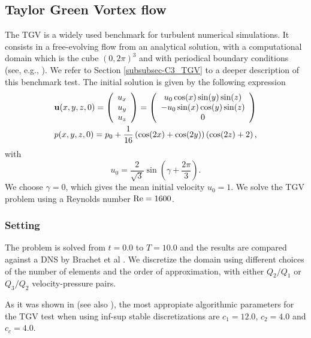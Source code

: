 \subsection{Taylor Green Vortex flow}
\label{subsec-C7_TGV-SRK}
The TGV is a widely used benchmark for turbulent numerical simulations. It consists in a free-evolving flow from an analytical solution, with a computational domain which is the cube $(0,2\pi)^3$ and with periodical boundary conditions (see, e.g., \cite{brachet_direct_1991}). We refer to Section \ref{subsubsec-C3_TGV} to a deeper description of this benchmark test. The initial solution is given by the following expression
\begin{align}
\label{eq-C7_ini_sol_TG}
&{\bf u}(x,y,z,0)=\left(\begin{array}{c}
u_x\\
u_y\\
u_z
\end{array}\right)=\left(\begin{array}{c}
u_0\cos(x)\sin(y)\sin(z)\\
-u_0\sin(x)\cos(y)\sin(z)\\
0
\end{array}\right)\\\nonumber
&p(x,y,z,0)=p_0+\frac{1}{16}\left(\cos(2x)+\cos(2y)\right)\left(\cos(2z)+2\right),
\end{align}
with
$$u_0=\frac{2}{\sqrt{3}}\sin\left(\gamma+\frac{2\pi}{3}\right).$$
We choose $\gamma=0$, which gives the mean initial velocity  $u_0=1$. We solve the TGV problem using a Reynolds number ${\rm Re}=1600$.

\subsubsection{Setting}
The problem is solved from $t=0.0$ to $T=10.0$ and the results are compared against a DNS by Brachet et al \cite{brachet_direct_1991}. We discretize the domain using different choices of the number of elements and the order of approximation, with either $ Q_2/Q_1 $ or $ Q_3/Q_2 $ velocity-pressure pairs.

As it was shown in \cite{colomes_mixed_2015} (see also ), the most appropiate algorithmic parameters for the TGV test when using inf-sup stable discretizations are $ c_1=12.0 $, $ c_2=4.0 $ and $ c_c=4.0 $.

